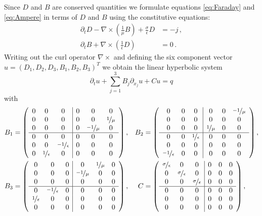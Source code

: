 \documentclass[a4paper,12pt]{article}
\theoremstyle{definition}
\theoremstyle{definition}
\begin{document}
Since $D$ and $B$ are conserved quantities we formulate equations \eqref{eq:Faraday} and
\eqref{eq:Ampere} in terms of $D$ and $B$ using the constitutive equations:
\begin{subequations}
	\begin{align}
	\partial_t D - \nabla\times\left(\frac{1}{\mu} B\right) + \frac{\sigma}{\epsilon} D &= - j\,,  \\
	\partial_t B + \nabla\times\left( \frac{1}{\epsilon} D \right) &= 0\, .
	\end{align}
\end{subequations}
Writing out the curl operator $\nabla\times$ and defining the six component
vector $u=(D_1,D_2,D_3,B_1,B_2,B_3)^T$ we obtain the linear hyperbolic system
\begin{equation}
\partial_t u + \sum_{j=1}^3 B_j \partial_{x_j} u + C u = q
\end{equation}
with
\begin{align*}
B_1 &= \left( \begin{array}{ccc|ccc}
0 & 0 & 0 & 0 & 0 & 0\\ 
0 & 0 & 0 & 0 & 0 & \nicefrac{1}{\mu}\\ 
0 & 0 & 0 & 0 & \nicefrac{-1}{\mu} & 0\\ 
\hline
0 & 0 & 0 & 0 & 0 & 0\\ 
0 & 0 & \nicefrac{-1}{\epsilon} & 0 & 0 & 0\\ 
0 & \nicefrac{1}{\epsilon} & 0 & 0 & 0 & 0
\end{array}
\right), &
B_2 &= \left( \begin{array}{ccc|ccc}
0 & 0 & 0 & 0 & 0 & \nicefrac{-1}{\mu}\\ 
0 & 0 & 0 & 0 & 0 & 0\\ 
0 & 0 & 0 & \nicefrac{1}{\mu} & 0 & 0\\ 
\hline
0 & 0 & \nicefrac{1}{\epsilon} & 0 & 0 & 0\\ 
0 & 0 & 0 & 0 & 0 & 0\\ 
\nicefrac{-1}{\epsilon} & 0 & 0 & 0 & 0 & 0
\end{array}
\right),\\
B_3 &= \left( \begin{array}{ccc|ccc}
0 & 0 & 0 & 0 & \nicefrac{1}{\mu} & 0\\ 
0 & 0 & 0 & \nicefrac{-1}{\mu} & 0 & 0\\ 
0 & 0 & 0 & 0 & 0 & 0\\ 
\hline
0 & \nicefrac{-1}{\epsilon} & 0 & 0 & 0 & 0\\ 
\nicefrac{1}{\epsilon} & 0 & 0 & 0 & 0 & 0\\ 
0 & 0 & 0 & 0 & 0 & 0
\end{array}
\right), &
C &= \left( \begin{array}{ccc|ccc}
\nicefrac{\sigma}{\epsilon} & 0 & 0 & 0 & 0 & 0\\ 
0 & \nicefrac{\sigma}{\epsilon} & 0 & 0 & 0 & 0\\ 
0 & 0 & \nicefrac{\sigma}{\epsilon} & 0 & 0 & 0\\ 
\hline
0 & 0 & 0 & 0 & 0 & 0\\ 
0 & 0 & 0 & 0 & 0 & 0\\ 
0 & 0 & 0 & 0 & 0 & 0
\end{array}
\right),
\end{align*}
\end{document}

